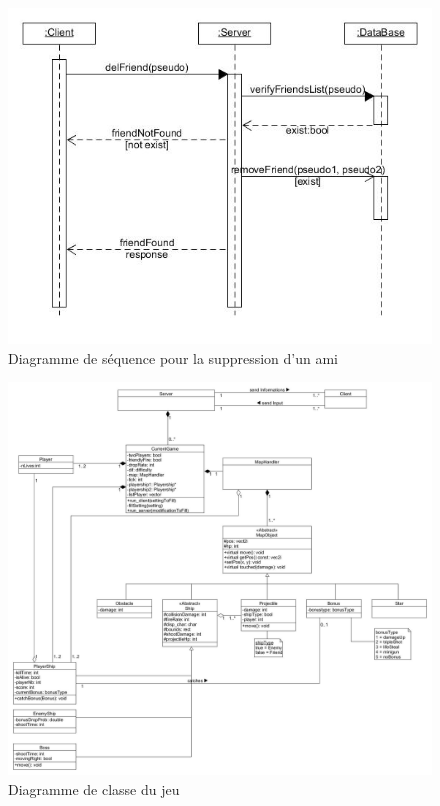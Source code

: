 \documentclass[a4paper,12pt]{article}
\begin{document}
\begin{figure}[hbtp]
\centering
\includegraphics[scale=0.5]{images/del_friend.jpg}
\caption{Diagramme de séquence pour la suppression d'un ami }
\end{figure}


\begin{figure}[hbtp]
\centering
\includegraphics[scale=0.3]{images/newGameClassDiagram.jpg}
\caption{Diagramme de classe du jeu}
\end{figure}
\end{document}
